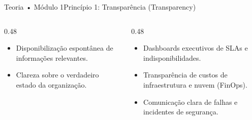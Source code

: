 \begin{senaiframe}{Teoria • Módulo 1}{Princípio 1: Transparência (Transparency)}
  \begin{columns}[t]
    \begin{column}{0.48\textwidth}
      \begin{tcolorbox}[senaibluecard, title={Conceito do IBGC}]
        \begin{itemize}
          \item Disponibilização espontânea de informações relevantes.
          \item Clareza sobre o verdadeiro estado da organização.
        \end{itemize}
      \end{tcolorbox}
    \end{column}
    \begin{column}{0.48\textwidth}
      \begin{tcolorbox}[senaigreencard, title={Aplicação Prática na TI}]
        \begin{itemize}
          \item Dashboards executivos de SLAs e indisponibilidades.
          \item Transparência de custos de infraestrutura e nuvem (FinOps).
          \item Comunicação clara de falhas e incidentes de segurança.
        \end{itemize}
      \end{tcolorbox}
    \end{column}
  \end{columns}
\end{senaiframe}

